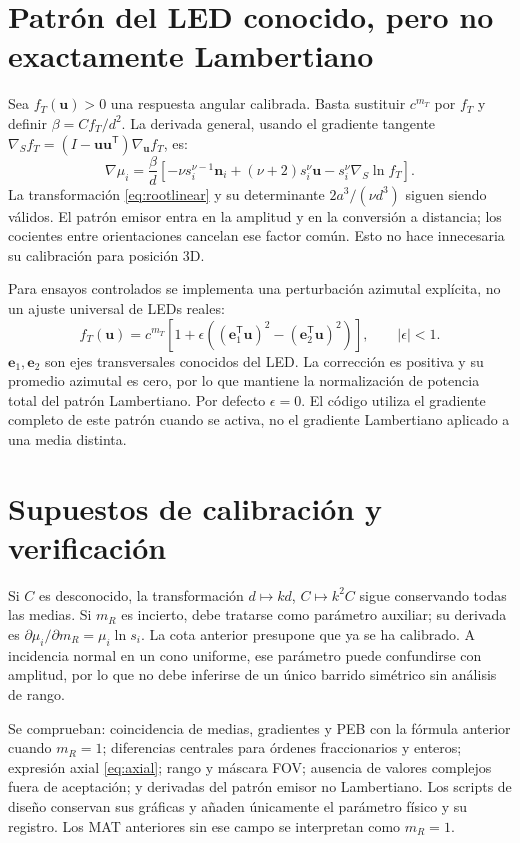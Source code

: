 \documentclass[11pt,a4paper]{article}
\begin{document}
\section{Patrón del LED conocido, pero no exactamente Lambertiano}
Sea $f_T(\mathbf u)>0$ una respuesta angular calibrada. Basta sustituir $c^{m_T}$ por $f_T$ y definir $\beta=Cf_T/d^2$. La derivada general, usando el gradiente tangente $\nabla_S f_T=(I-\mathbf u\mathbf u^{\mathsf T})\nabla_{\mathbf u}f_T$, es:
\begin{equation}
 \nabla\mu_i=\frac{\beta}{d}\left[-\nu s_i^{\nu-1}\mathbf n_i
 +(\nu+2)s_i^\nu\mathbf u-s_i^\nu\nabla_S\ln f_T\right].
\end{equation}
La transformación \eqref{eq:rootlinear} y su determinante $2a^3/(\nu d^3)$ siguen siendo válidos. El patrón emisor entra en la amplitud y en la conversión a distancia; los cocientes entre orientaciones cancelan ese factor común. Esto no hace innecesaria su calibración para posición 3D.

Para ensayos controlados se implementa una perturbación azimutal explícita, no un ajuste universal de LEDs reales:
\begin{equation}
 f_T(\mathbf u)=c^{m_T}\left[1+\epsilon\left((\mathbf e_1^{\mathsf T}\mathbf u)^2-(\mathbf e_2^{\mathsf T}\mathbf u)^2\right)\right],\qquad |\epsilon|<1.
\end{equation}
$\mathbf e_1,\mathbf e_2$ son ejes transversales conocidos del LED. La corrección es positiva y su promedio azimutal es cero, por lo que mantiene la normalización de potencia total del patrón Lambertiano. Por defecto $\epsilon=0$. El código utiliza el gradiente completo de este patrón cuando se activa, no el gradiente Lambertiano aplicado a una media distinta.

\section{Supuestos de calibración y verificación}
Si $C$ es desconocido, la transformación $d\mapsto kd$, $C\mapsto k^2C$ sigue conservando todas las medias. Si $m_R$ es incierto, debe tratarse como parámetro auxiliar; su derivada es $\partial\mu_i/\partial m_R=\mu_i\ln s_i$. La cota anterior presupone que ya se ha calibrado. A incidencia normal en un cono uniforme, ese parámetro puede confundirse con amplitud, por lo que no debe inferirse de un único barrido simétrico sin análisis de rango.

Se comprueban: coincidencia de medias, gradientes y PEB con la fórmula anterior cuando $m_R=1$; diferencias centrales para órdenes fraccionarios y enteros; expresión axial \eqref{eq:axial}; rango y máscara FOV; ausencia de valores complejos fuera de aceptación; y derivadas del patrón emisor no Lambertiano. Los scripts de diseño conservan sus gráficas y añaden únicamente el parámetro físico y su registro. Los MAT anteriores sin ese campo se interpretan como $m_R=1$.



\end{document}
